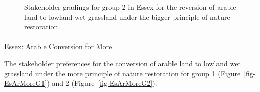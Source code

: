 \documentclass[
  12pt,
  letterpaper,
  DIV=11,
  numbers=noendperiod]{scrartcl}
\makeatletter
\let\oldparagraph\paragraph
\renewcommand{\paragraph}{
    \@ifstar
      \xxxParagraphStar
      \xxxParagraphNoStar
  }
\newcommand{\xxxParagraphStar}[1]{\oldparagraph*{#1}\mbox{}}
\newcommand{\xxxParagraphNoStar}[1]{\oldparagraph{#1}\mbox{}}
\makeatother
\begin{document}
\begin{figure}[H]


\caption{\label{fig-EsArBigG2}Stakeholder gradings for group 2 in Essex
for the reversion of arable land to lowland wet grassland under the
bigger principle of nature restoration}

\end{figure}%

\newpage{}

\paragraph{Essex: Arable Conversion for
More}\label{essex-arable-conversion-for-more}

The stakeholder preferences for the conversion of arable land to lowland
wet grassland under the more principle of nature restoration for group 1
(Figure~\ref{fig-EsArMoreG1}) and 2 (Figure~\ref{fig-EsArMoreG2}).
\end{document}

